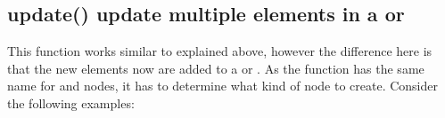 \documentclass[a4paper,10pt,english]{sphinxmanual}
\begin{document}
\subsection{update() \textendash{} update multiple elements in a  or }
\label{\detokenize{README:update-update-multiple-elements-in-a-set-or-dict}}
\sphinxAtStartPar
This function works similar to {\hyperref[\detokenize{README:extend-extending-a-list-with-multiple-elements}]{}} explained above, however the difference here is that the new elements now are added to a  or . As the function has the same name for  and \sphinxhyphen{}nodes, it has to determine what kind of node to create. Consider the following examples:
\end{document}
